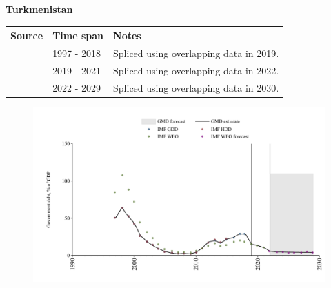 \documentclass[12pt,a4paper,landscape]{article}
\begin{document}
\begin{adjustbox}{max totalsize={\paperwidth}{\paperheight},center}
\begin{minipage}[t][\textheight][t]{\textwidth}
\vspace*{0.5cm}
{}
\begin{center}
{\Large\bfseries Turkmenistan}
\end{center}
\vspace{0.5cm}
\begin{table}[H]
\centering
\small
\begin{tabular}{|l|l|l|}
\hline
\textbf{Source} & \textbf{Time span} & \textbf{Notes} \\
\hline
\rowcolor{white}\cite{IMF_GDD}& 1997 - 2018 &Spliced using overlapping data in 2019.\\
\rowcolor{lightgray}\cite{IMF_WEO}& 2019 - 2021 &Spliced using overlapping data in 2022.\\
\rowcolor{white}\cite{IMF_WEO_forecast}& 2022 - 2029 &Spliced using overlapping data in 2030.\\
\hline
\end{tabular}
\end{table}
\begin{figure}[H]
\centering
\includegraphics[width=\textwidth,height=0.6\textheight,keepaspectratio]{graphs/TKM_govdebt_GDP.pdf}
\end{figure}
\end{minipage}
\end{adjustbox}
\end{document}
